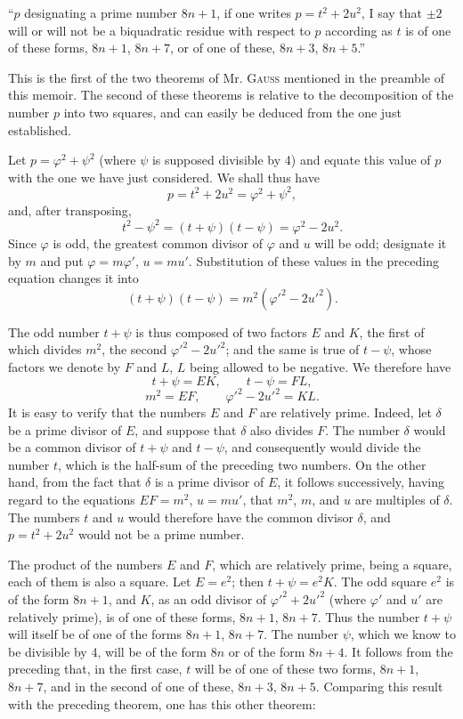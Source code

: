 \documentclass[11pt]{article}
\newcommand{\unitid}[1]{\hypertarget{#1}{}}
\begin{document}
\unitid{dirichlet.v1.p04a.en.thm.003}“$p$ designating a prime number $8n+1$, if one writes $p=t^2+2u^2$, I say that $\pm2$ will or will not be a biquadratic residue with respect to $p$ according as $t$ is of one of these forms, $8n+1$, $8n+7$, or of one of these, $8n+3$, $8n+5$.”

\unitid{dirichlet.v1.p04a.en.par.012}This is the first of the two theorems of Mr. \textsc{Gauss} mentioned in the preamble of this memoir. The second of these theorems is relative to the decomposition of the number $p$ into two squares, and can easily be deduced from the one just established.

\unitid{dirichlet.v1.p04a.en.par.013}Let $p=\varphi^2+\psi^2$ (where $\psi$ is supposed divisible by 4) and equate this value of $p$ with the one we have just considered. We shall thus have
\[
 p=t^2+2u^2=\varphi^2+\psi^2,
\]
and, after transposing,
\[
 t^2-\psi^2=(t+\psi)(t-\psi)=\varphi^2-2u^2.
\]
Since $\varphi$ is odd, the greatest common divisor of $\varphi$ and $u$ will be odd; designate it by $m$ and put $\varphi=m\varphi'$, $u=mu'$. Substitution of these values in the preceding equation changes it into
\[
 (t+\psi)(t-\psi)=m^2(\varphi'^2-2u'^2).
\]

\unitid{dirichlet.v1.p04a.en.par.014}The odd number $t+\psi$ is thus composed of two factors $E$ and $K$, the first of which divides $m^2$, the second $\varphi'^2-2u'^2$; and the same is true of $t-\psi$, whose factors we denote by $F$ and $L$, $L$ being allowed to be negative. We therefore have
\[
 t+\psi=EK,
\qquad t-\psi=FL,
\]
\[
 m^2=EF,
\qquad \varphi'^2-2u'^2=KL.
\]
It is easy to verify that the numbers $E$ and $F$ are relatively prime. Indeed, let $\delta$ be a prime divisor of $E$, and suppose that $\delta$ also divides $F$. The number $\delta$ would be a common divisor of $t+\psi$ and $t-\psi$, and consequently would divide the number $t$, which is the half-sum of the preceding two numbers. On the other hand, from the fact that $\delta$ is a prime divisor of $E$, it follows successively, having regard to the equations $EF=m^2$, $u=mu'$, that $m^2$, $m$, and $u$ are multiples of $\delta$. The numbers $t$ and $u$ would therefore have the common divisor $\delta$, and $p=t^2+2u^2$ would not be a prime number.

\unitid{dirichlet.v1.p04a.en.par.015}The product of the numbers $E$ and $F$, which are relatively prime, being a square, each of them is also a square. Let $E=e^2$; then $t+\psi=e^2K$. The odd square $e^2$ is of the form $8n+1$, and $K$, as an odd divisor of $\varphi'^2+2u'^2$ (where $\varphi'$ and $u'$ are relatively prime), is of one of these forms, $8n+1$, $8n+7$. Thus the number $t+\psi$ will itself be of one of the forms $8n+1$, $8n+7$. The number $\psi$, which we know to be divisible by 4, will be of the form $8n$ or of the form $8n+4$. It follows from the preceding that, in the first case, $t$ will be of one of these two forms, $8n+1$, $8n+7$, and in the second of one of these, $8n+3$, $8n+5$. Comparing this result with the preceding theorem, one has this other theorem:
\end{document}
